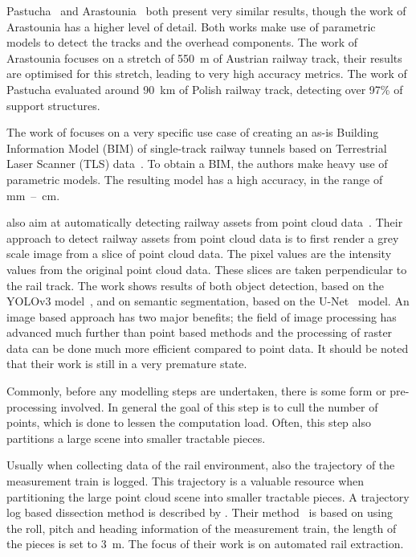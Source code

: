 Pastucha~\cite{pastucha2016catenary} and Arastounia~\cite{arastounia2015automated} both present very similar results, though the work of Arastounia has a higher level of detail. Both works make use of parametric models to detect the tracks and the overhead components. The work of Arastounia focuses on a stretch of 550~m of Austrian railway track, their results are optimised for this stretch, leading to very high accuracy metrics. The work of Pastucha evaluated around 90~km of Polish railway track, detecting over 97\% of support structures.

The work of \citeauthor{cheng2019automatic} focuses on a very specific use case of creating an as-is Building Information Model (BIM) of single-track railway tunnels based on Terrestrial Laser Scanner (TLS) data~\cite{cheng2019automatic}. To obtain a BIM, the authors make heavy use of parametric models. The resulting model has a high accuracy, in the range of mm~--~cm.

\citeauthor{wolf2021asset} also aim at automatically detecting railway assets from point cloud data~\cite{wolf2021asset}. Their approach to detect railway assets from point cloud data is to first render a grey scale image from a slice of point cloud data. The pixel values are the intensity values from the original point cloud data. These slices are taken perpendicular to the rail track. The work shows results of both object detection, based on the YOLOv3 model~\cite{yolov3}, and on semantic segmentation, based on the U-Net~\cite{unet} model. An image based approach has two major benefits; the field of image processing has advanced much further than point based methods and the processing of raster data can be done much more efficient compared to point data. It should be noted that their work is still in a very premature state.

Commonly, before any modelling steps are undertaken, there is some form or pre-processing involved. In general the goal of this step is to cull the number of points, which is done to lessen the computation load. Often, this step also partitions a large scene into smaller tractable pieces.

Usually when collecting data of the rail environment, also the trajectory of the measurement train is logged. This trajectory is a valuable resource when partitioning the large point cloud scene into smaller tractable pieces. A trajectory log based dissection method is described by \citeauthor{soilan2021fully}. Their method~\cite{soilan2021fully} is based on using the roll, pitch and heading information of the measurement train, the length of the pieces is set to 3~m. The focus of their work is on automated rail extraction.

